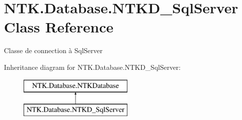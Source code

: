 \hypertarget{class_n_t_k_1_1_database_1_1_n_t_k_d___sql_server}{}\section{N\+T\+K.\+Database.\+N\+T\+K\+D\+\_\+\+Sql\+Server Class Reference}
\label{class_n_t_k_1_1_database_1_1_n_t_k_d___sql_server}


Classe de connection à Sql\+Server  


Inheritance diagram for N\+T\+K.\+Database.\+N\+T\+K\+D\+\_\+\+Sql\+Server\+:\begin{figure}[H]
\begin{center}
\leavevmode
\includegraphics[height=2.000000cm]{d2/d79/class_n_t_k_1_1_database_1_1_n_t_k_d___sql_server}
\end{center}
\end{figure}
